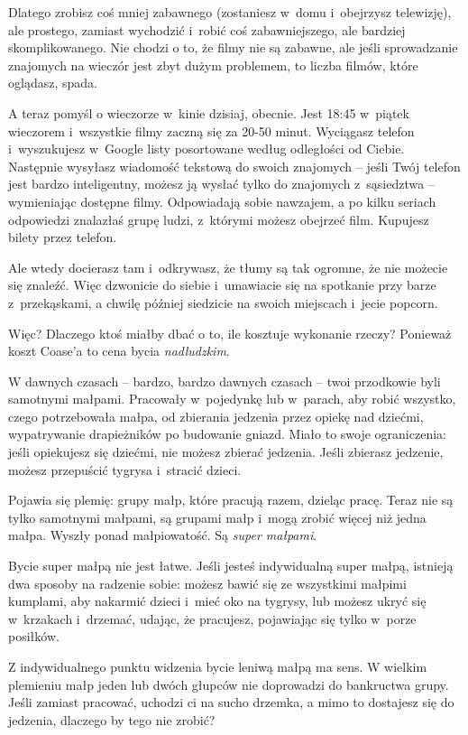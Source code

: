 \documentclass[oneside,polish,11pt,rmheadings]{mwbk}
\begin{document}
Dlatego zrobisz coś mniej zabawnego (zostaniesz w~domu i~obejrzysz telewizję), ale prostego, zamiast wychodzić i~robić coś zabawniejszego, ale bardziej skomplikowanego. Nie chodzi o to, że filmy nie są zabawne, ale jeśli sprowadzanie znajomych na wieczór jest zbyt dużym problemem, to liczba filmów, które oglądasz, spada.

A teraz pomyśl o wieczorze w~kinie dzisiaj, obecnie. Jest 18:45 w~piątek wieczorem i~wszystkie filmy zaczną się za 20-50 minut. Wyciągasz telefon i~wyszukujesz w~Google listy posortowane według odległości od Ciebie. Następnie wysyłasz wiadomość tekstową do swoich znajomych -- jeśli Twój telefon jest bardzo inteligentny, możesz ją wysłać tylko do znajomych z~sąsiedztwa -- wymieniając dostępne filmy. Odpowiadają sobie nawzajem, a po kilku seriach odpowiedzi znalazłaś grupę ludzi, z~którymi możesz obejrzeć film. Kupujesz bilety przez telefon.

Ale wtedy docierasz tam i~odkrywasz, że tłumy są tak ogromne, że nie możecie się znaleźć. Więc dzwonicie do siebie i~umawiacie się na spotkanie przy barze z~przekąskami, a chwilę później siedzicie na swoich miejscach i~jecie popcorn.

Więc? Dlaczego ktoś miałby dbać o to, ile kosztuje wykonanie rzeczy? Ponieważ koszt Coase'a to cena bycia \textit{nadludzkim}.

W dawnych czasach -- bardzo, bardzo dawnych czasach -- twoi przodkowie byli samotnymi małpami. Pracowały w~pojedynkę lub w~parach, aby robić wszystko, czego potrzebowała małpa, od zbierania jedzenia przez opiekę nad dziećmi, wypatrywanie drapieżników po budowanie gniazd. Miało to swoje ograniczenia: jeśli opiekujesz się dziećmi, nie możesz zbierać jedzenia. Jeśli zbierasz jedzenie, możesz przepuścić tygrysa i~stracić dzieci.

Pojawia się plemię: grupy małp, które pracują razem, dzieląc pracę. Teraz nie są tylko samotnymi małpami, są grupami małp i~mogą zrobić więcej niż jedna małpa. Wyszły ponad małpiowatość. Są \textit{super małpami}.

Bycie super małpą nie jest łatwe. Jeśli jesteś indywidualną super małpą, istnieją dwa sposoby na radzenie sobie: możesz bawić się ze wszystkimi małpimi kumplami, aby nakarmić dzieci i~mieć oko na tygrysy, lub możesz ukryć się w~krzakach i~drzemać, udając, że pracujesz, pojawiając się tylko w~porze posiłków.

Z indywidualnego punktu widzenia bycie leniwą małpą ma sens. W wielkim plemieniu małp jeden lub dwóch głupców nie doprowadzi do bankructwa grupy. Jeśli zamiast pracować, uchodzi ci na sucho drzemka, a mimo to dostajesz się do jedzenia, dlaczego by tego nie zrobić?
\end{document}
